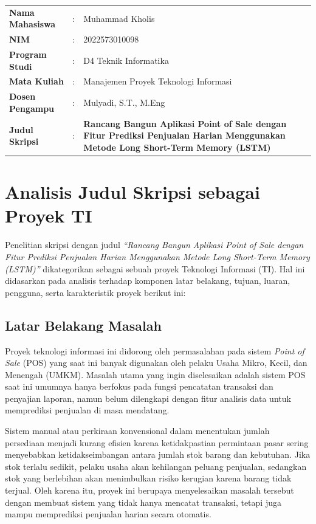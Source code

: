 \documentclass[12pt, a4paper]{article}
\begin{document}
\begin{table}[h!]
    \centering
    \fontsize{11pt}{13pt}\selectfont
    \begin{tabular}{p{4cm}cp{10cm}}
        \textbf{Nama Mahasiswa} & : & Muhammad Kholis \\
        \textbf{NIM} & : & 2022573010098 \\
        \textbf{Program Studi} & : & D4 Teknik Informatika \\
        \textbf{Mata Kuliah} & : & Manajemen Proyek Teknologi Informasi \\
        \textbf{Dosen Pengampu} & : & Mulyadi, S.T., M.Eng \\
        \textbf{Judul Skripsi} & : & \parbox[t]{10cm}{\textbf{Rancang Bangun Aplikasi Point of Sale dengan Fitur Prediksi Penjualan Harian Menggunakan Metode Long Short-Term Memory (LSTM)}}
    \end{tabular}
\end{table}

\vspace{0.4cm}

\section{Analisis Judul Skripsi sebagai Proyek TI}

Penelitian skripsi dengan judul \textit{``Rancang Bangun Aplikasi Point of Sale dengan Fitur Prediksi Penjualan Harian Menggunakan Metode Long Short-Term Memory (LSTM)''} dikategorikan sebagai sebuah proyek Teknologi Informasi (TI). Hal ini didasarkan pada analisis terhadap komponen latar belakang, tujuan, luaran, pengguna, serta karakteristik proyek berikut ini:

\subsection{Latar Belakang Masalah}
Proyek teknologi informasi ini didorong oleh permasalahan pada sistem \textit{Point of Sale} (POS) yang saat ini banyak digunakan oleh pelaku Usaha Mikro, Kecil, dan Menengah (UMKM). Masalah utama yang ingin diselesaikan adalah sistem POS saat ini umumnya hanya berfokus pada fungsi pencatatan transaksi dan penyajian laporan, namun belum dilengkapi dengan fitur analisis data untuk memprediksi penjualan di masa mendatang.

Sistem manual atau perkiraan konvensional dalam menentukan jumlah persediaan menjadi kurang efisien karena ketidakpastian permintaan pasar sering menyebabkan ketidakseimbangan antara jumlah stok barang dan kebutuhan. Jika stok terlalu sedikit, pelaku usaha akan kehilangan peluang penjualan, sedangkan stok yang berlebihan akan menimbulkan risiko kerugian karena barang tidak terjual. Oleh karena itu, proyek ini berupaya menyelesaikan masalah tersebut dengan membuat sistem yang tidak hanya mencatat transaksi, tetapi juga mampu memprediksi penjualan harian secara otomatis.
\end{document}
